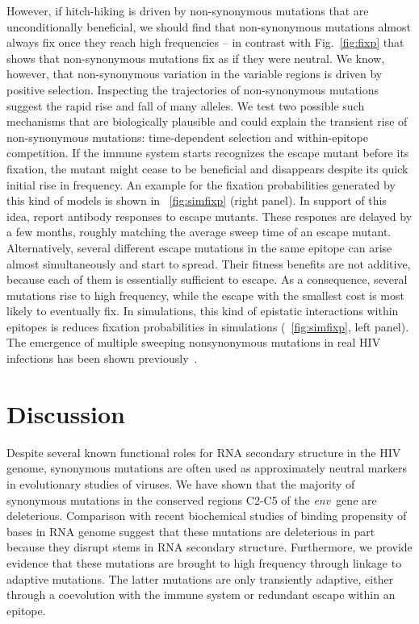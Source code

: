 \documentclass[rmp, twocolumn]{revtex4}
\newcommand{\env}{\textit{env}}
\newcommand{\FIG}[1]{Fig.~\ref{fig:#1}}
\begin{document}
However, if hitch-hiking is driven by non-synonymous mutations that are unconditionally beneficial, we should find that non-synonymous mutations almost always fix once they reach high frequencies -- in contrast with \FIG{fixp} that shows that non-synonymous mutations fix as if they were neutral. We know, however, that non-synonymous variation in the variable regions is driven by positive selection. Inspecting the trajectories of non-synonymous mutations suggest the rapid rise and fall of many alleles.  We test two possible such mechanisms that are biologically plausible
and could explain the transient rise of non-synonymous mutations: time-dependent selection and
within-epitope competition. If the immune system starts recognizes the escape mutant before its fixation, the mutant might cease to be beneficial and disappears despite its quick initial rise in
frequency. An example for the fixation probabilities generated by this kind of
models is shown in \figurename~\ref{fig:simfixp} (right panel). In support of this idea, \citet{richman_rapid_2003,
bunnik_autologous_2008} report antibody responses to escape mutants. These respones are delayed by a few months, roughly matching the average sweep time of an escape mutant. Alternatively, several different escape mutations in the same epitope can arise almost simultaneously and start to spread. Their fitness benefits are not additive, because each of them is essentially sufficient to escape. As a consequence, several mutations rise to high frequency, while the escape with the smallest cost is most likely to eventually fix. In simulations, this kind of epistatic interactions within epitopes is reduces fixation probabilities in simulations (\figurename~\ref{fig:simfixp}, left panel). The emergence of multiple sweeping nonsynonymous mutations in real HIV infections has been shown
previously~\citep{moore_limited_2009}.

\section{Discussion}
Despite several known functional roles for RNA secondary structure in the HIV genome, synonymous mutations are often used as approximately neutral markers in evolutionary studies of viruses. We have shown that the majority of synonymous mutations in the conserved regions C2-C5 of the \env~gene are deleterious. Comparison with recent biochemical studies of binding propensity of bases in RNA genome suggest that these mutations are deleterious in part because they disrupt stems in RNA secondary structure. Furthermore, we provide evidence that these mutations are brought to high frequency through linkage to adaptive mutations. The latter  mutations are only transiently adaptive, either through a coevolution with the immune system or redundant escape within an epitope. 
\end{document}
